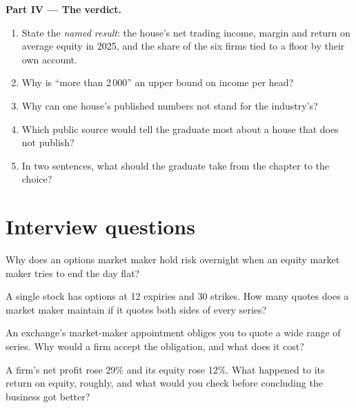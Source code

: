 \begin{problem}
\medskip\noindent\textbf{Part IV --- The verdict.}
\begin{enumerate}[resume]
\item State the \emph{named result}: the house's net trading income, margin and return on average equity in 2025, and
the share of the six firms tied to a floor by their own account.
\item Why is ``more than 2\,000'' an upper bound on income per head?
\item Why can one house's published numbers not stand for the industry's?
\item Which public source would tell the graduate most about a house that does not publish?
\item In two sentences, what should the graduate take from the chapter to the choice?
\end{enumerate}
\end{problem}

\section{Interview questions}

\begin{interviewq}\label{iq:in:the-options-market-making-houses:1}
Why does an options market maker hold risk overnight when an equity market maker tries to end the day flat?
\end{interviewq}

\begin{interviewq}\label{iq:in:the-options-market-making-houses:2}
A single stock has options at 12 expiries and 30 strikes. How many quotes does a market maker maintain if it quotes
both sides of every series?
\end{interviewq}

\begin{interviewq}\label{iq:in:the-options-market-making-houses:3}
An exchange's market-maker appointment obliges you to quote a wide range of series. Why would a firm accept the
obligation, and what does it cost?
\end{interviewq}

\begin{interviewq}\label{iq:in:the-options-market-making-houses:4}
A firm's net profit rose 29\% and its equity rose 12\%. What happened to its return on equity, roughly, and what would
you check before concluding the business got better?
\end{interviewq}

